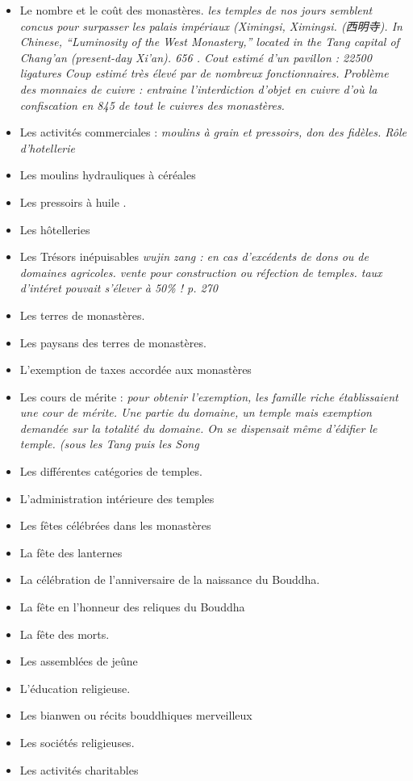     \begin{itemize}
        \item Le nombre et le coût des monastères. \textit{les temples de nos jours semblent concus pour surpasser les palais impériaux (Ximingsi, Ximingsi. (西明寺). In Chinese, “Luminosity of the West Monastery,” located in the Tang capital of Chang’an (present-day Xi’an). 656 . Cout estimé d'un pavillon : 22500 ligatures Coup estimé très élevé par de nombreux fonctionnaires. Problème des monnaies de cuivre : entraine l'interdiction d'objet en cuivre d'où la confiscation en 845 de tout le cuivres des monastères.   }
        \item Les activités commerciales : \textit{moulins à grain et pressoirs, don des fidèles. Rôle d'hotellerie}
        \item Les moulins hydrauliques à céréales
        \item Les pressoirs à huile .
        \item Les hôtelleries
        \item Les Trésors inépuisables \textit{wujin zang : en cas d'excédents de dons ou de domaines agricoles. vente pour construction ou réfection de temples. taux d'intéret pouvait s'élever à 50\% ! p. 270 }
        \item Les terres de monastères.
        \item Les paysans des terres de monastères.
        \item L'exemption de taxes accordée aux monastères
        \item Les cours de mérite : \textit{pour obtenir l'exemption, les famille riche établissaient une cour de mérite. Une partie du domaine, un temple mais exemption demandée sur la totalité du domaine.  On se dispensait même d'édifier le temple. (sous les Tang puis les Song}
        \item Les différentes catégories de temples.
        \item L'administration intérieure des temples
        \item Les fêtes célébrées dans les monastères
        \item La fête des lanternes
        \item La célébration de l'anniversaire de la naissance du Bouddha.
        \item La fête en l'honneur des reliques du Bouddha
        \item La fête des morts.
        \item Les assemblées de jeûne
        \item L'éducation religieuse.
        \item Les bianwen ou récits bouddhiques merveilleux
        \item Les sociétés religieuses.
        \item Les activités charitables
    \end{itemize}

